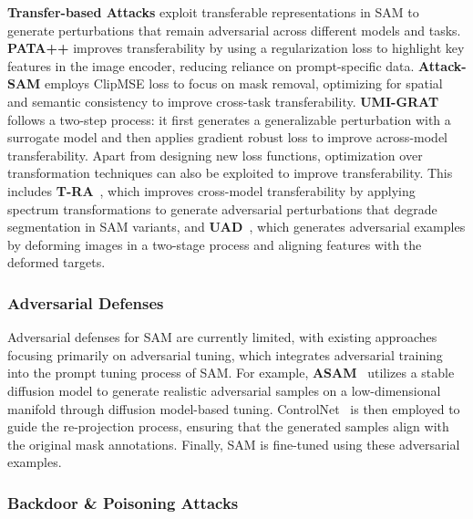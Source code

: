 \textbf{Transfer-based Attacks} exploit transferable representations in SAM to generate perturbations that remain adversarial across different models and tasks. 
\textbf{PATA++}\cite{zheng2023black} improves transferability by using a regularization loss to highlight key features in the image encoder, reducing reliance on prompt-specific data. 
\textbf{Attack-SAM}\cite{zhang2023attack} employs ClipMSE loss to focus on mask removal, optimizing for spatial and semantic consistency to improve cross-task transferability. 
\textbf{UMI-GRAT}~\cite{xia2024transferable} follows a two-step process: it first generates a generalizable perturbation with a surrogate model and then applies gradient robust loss to improve across-model transferability.
Apart from designing new loss functions, optimization over transformation techniques can also be exploited to improve transferability.
This includes \textbf{T-RA}~\cite{shen2024practical}, which improves cross-model transferability by applying spectrum transformations to generate adversarial perturbations that degrade segmentation in SAM variants, and \textbf{UAD}~\cite{lu2024unsegment}, which generates adversarial examples by deforming images in a two-stage process and aligning features with the deformed targets.



\subsubsection{Adversarial Defenses}\label{sec:SAM-advdefense}

Adversarial defenses for SAM are currently limited, with existing approaches focusing primarily on adversarial tuning, which integrates adversarial training into the prompt tuning process of SAM. For example, \textbf{ASAM}~\cite{li2024asam} utilizes a stable diffusion model to generate realistic adversarial samples on a low-dimensional manifold through diffusion model-based tuning. ControlNet~\cite{ControlNet} is then employed to guide the re-projection process, ensuring that the generated samples align with the original mask annotations. Finally, SAM is fine-tuned using these adversarial examples.





\subsubsection{Backdoor \& Poisoning Attacks}\label{sec:SAM-backdoor_poisoning}


